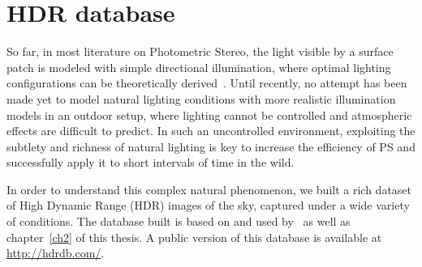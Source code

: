 



\section{HDR database}
\label{sec:hdrdb}


So far, in most literature on Photometric Stereo, the light visible by a surface patch is modeled with simple directional illumination, where optimal lighting configurations can be theoretically derived~\cite{drbohlav-iccv-05,klaudiny-prl-14,shen-pg-14}. Until recently, no attempt has been made yet to model natural lighting conditions with more realistic illumination models in an outdoor setup, where lighting cannot be controlled and atmospheric effects are difficult to predict. In such an uncontrolled environment, exploiting the subtlety and richness of natural lighting is key to increase the efficiency of PS and successfully apply it to short intervals of time in the wild.

In order to understand this complex natural phenomenon, we built a rich dataset of High Dynamic Range (HDR) images of the sky, captured under a wide variety of conditions. The database built is based on and used by~\cite{lalonde-3dv-14,holdgeoffroy-iccp-15,holdgeoffroy-3dv-15} as well as chapter~\ref{ch2} of this thesis. A public version of this database is available at \url{http://hdrdb.com/}.


